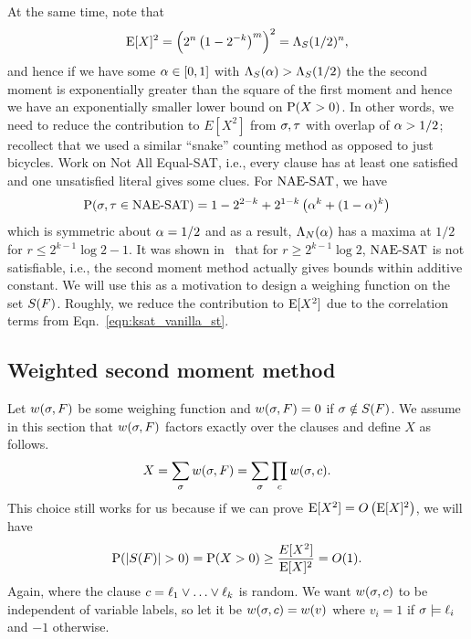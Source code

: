 \documentclass[letterpaper, 10pt, twocolumn, reqno]{amsart}
\begin{document}
At the same time, note that
$$
\E[X]^2 = \rbrac{2^n \rbrac{1 - 2^{-k}}^m }^2 = \L_S(1/2)^n,
$$
and hence if we have some $\a \in [0,1]$ with $\L_S(\a) > \L_S(1/2)$ the
the second moment is exponentially greater than the square of the first moment and hence we have an exponentially smaller lower bound on $\P(X > 0)$. In
other words, we need to reduce the contribution to $E[X^2]$ from $\s,\t$ with overlap of $\a > 1/2$; recollect that we used a similar ``snake'' counting method as opposed to just bicycles. Work on Not All Equal-SAT, i.e., every clause has at
least one satisfied and one unsatisfied literal gives some clues. For $\NAESAT$, we have
$$
\P(\s,\t \in \NAESAT) = 1 - 2^{2-k} + 2^{1-k} \rbrac{\a^k + (1-\a)^k}
$$
which is symmetric about $\a = 1/2$ and as a result, $\L_N(\a)$ has a maxima at $1/2$ for $r \leq 2^{k-1} \log2 -1$. It was shown in~\cite{achlioptas2002asymptotic} that for $r \geq 2^{k-1} \log2$, $\NAESAT$ is not satisfiable, i.e., the second moment method actually gives bounds within additive constant. We will use this as a motivation to design a weighing function on the set $\sf$. Roughly, we reduce the contribution to $\E[X^2]$ due to the correlation terms from Eqn.~\eqref{eqn:ksat_vanilla_st}.

\subsection{Weighted second moment method}
\label{ssec:ksat_weighted}
Let $\wsf$ be some weighing function and $\wsf = 0$ if $\s \notin \sf$. We assume in this section that $\wsf$ factors exactly over the clauses and define $X$ as follows.
$$X = \sum_\s \wsf = \sum_\s \prod_c \wsc.$$
This choice still works for us because if we can prove $\E[X^2] = \bigo\rbrac{\E[X]^2}$, we will have
$$\P(\abs{\sf} > 0) = \P(X > 0) \geq \f{E[X^2]}{\E[X]^2} = \bigo(1).$$
Again,
where the clause $c = \ell_1 \oor \ldots \oor \ell_k$ is random. We want $\wsc$ to be independent of variable labels, so let it be $\wsc = \wv$ where $v_i =1$ if $\s \sat \ell_i$ and $-1$ otherwise.
\end{document}
